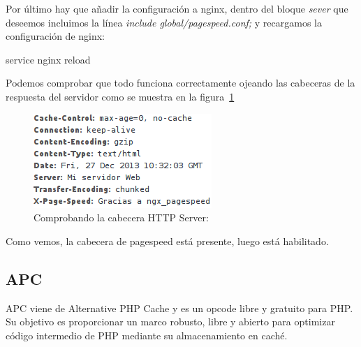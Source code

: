 Por último hay que añadir la configuración a nginx, dentro del bloque \emph{sever}
que deseemos incluimos la línea \emph{include global/pagespeed.conf;} y
recargamos la configuración de nginx:
\begin{bashcode}
service nginx reload
\end{bashcode}
Podemos comprobar que todo funciona correctamente ojeando  las cabeceras
de la respuesta del servidor como se muestra en la figura~\ref{pagespeed}
\begin{figure}[H]
\centering
\includegraphics[scale=.5]{./img/pagespeed.png}
\caption{Comprobando la cabecera HTTP Server:}
\label{pagespeed}
\end{figure}
Como vemos, la cabecera de pagespeed está presente, luego está habilitado.
\subsection{APC}
APC viene de Alternative PHP Cache y es un opcode libre y gratuito para PHP.
Su objetivo es proporcionar un marco robusto, libre y abierto para optimizar código
intermedio de PHP mediante su almacenamiento en caché.
